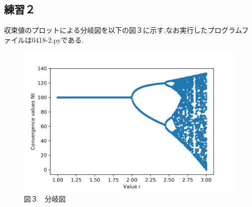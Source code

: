 \documentclass{jarticle}
\begin{document}
\subsection*{練習２}
	収束値のプロットによる分岐図を以下の図３に示す.なお実行したプログラムファイルは0418-2.pyである.
	\begin{figure}[H]
	\centering
	\includegraphics[width=0.8\linewidth]{hw2.png}
	\caption{図３　分岐図}
	\end{figure}
\end{document}
